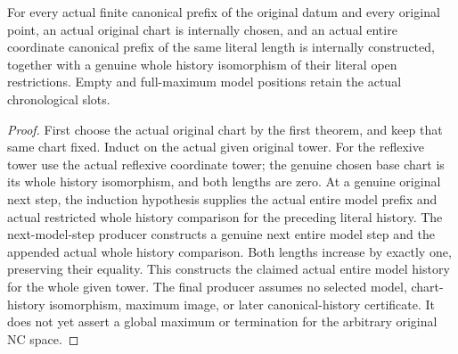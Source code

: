 \begin{theorem}
\label{hir:general-nc-every-actual-canonical-prefix-coordinate-history}
For every actual finite canonical prefix of the original datum and
every original point, an actual original chart is internally chosen,
and an actual entire coordinate canonical prefix of the same literal
length is internally constructed, together with a genuine whole
history isomorphism of their literal open restrictions. Empty and
full-maximum model positions retain the actual chronological slots.
\leanok
{}
\end{theorem}
\begin{proof}
First choose the actual original chart by the first theorem, and keep
that same chart fixed. Induct on the actual given original tower. For
the reflexive tower use the actual reflexive coordinate tower; the
genuine chosen base chart is its whole history isomorphism, and both
lengths are zero. At a genuine original next step, the induction
hypothesis supplies the actual entire model prefix and actual
restricted whole history comparison for the preceding literal
history. The next-model-step producer constructs a genuine next
entire model step and the appended actual whole history comparison.
Both lengths increase by exactly one, preserving their equality.
This constructs the claimed actual entire model history for the
whole given tower. The final producer assumes no selected model,
chart-history isomorphism, maximum image, or later canonical-history
certificate. It does not yet assert a global maximum or termination
for the arbitrary original NC space.
\end{proof}
